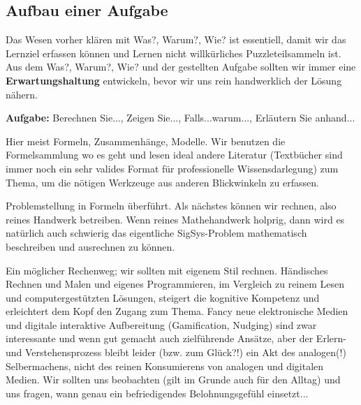 \subsection*{Aufbau einer Aufgabe}
\begin{Ziel}
Das Wesen vorher klären mit Was?, Warum?, Wie? ist essentiell, damit wir das
Lernziel erfassen können und Lernen nicht willkürliches Puzzleteilsammeln ist.
Aus dem Was?, Warum?, Wie? und der gestellten Aufgabe sollten wir immer eine
\textbf{Erwartungshaltung} entwickeln, bevor wir uns rein handwerklich der Lösung nähern.
\end{Ziel}
\textbf{Aufgabe:} Berechnen Sie..., Zeigen Sie..., Falls...warum..., Erläutern
Sie anhand...
\begin{Werkzeug}
Hier meist Formeln, Zusammenhänge, Modelle. Wir benutzen die Formelsammlung
wo es geht und lesen ideal andere Literatur (Textbücher sind immer noch ein sehr
valides Format für professionelle Wissensdarlegung) zum Thema, um die nötigen
Werkzeuge aus anderen Blickwinkeln zu erfassen.
\end{Werkzeug}
\begin{Ansatz}
Problemstellung in Formeln überführt. Als nächstes können wir rechnen, also
reines Handwerk betreiben. Wenn reines Mathehandwerk holprig, dann wird es natürlich auch schwierig das eigentliche SigSys-Problem mathematisch beschreiben und ausrechnen zu können.
\end{Ansatz}
\begin{ExCalc}
Ein möglicher Rechenweg; wir sollten mit eigenem Stil
rechnen.
Händisches Rechnen und Malen und eigenes Programmieren, im Vergleich zu reinem
Lesen und computergestützten Lösungen, steigert die kognitive Kompetenz und
erleichtert dem Kopf den Zugang zum Thema.
%
Fancy neue elektronische Medien und digitale interaktive Aufbereitung (Gamification, Nudging) sind zwar interessante und wenn gut gemacht auch zielführende Ansätze,
aber der Erlern- und Verstehensprozess bleibt leider (bzw. zum Glück?!) ein
Akt des analogen(!) Selbermachens, nicht des reinen Konsumierens von analogen und digitalen Medien.
%
Wir sollten uns beobachten (gilt im Grunde auch für den Alltag) und uns fragen, wann genau ein
befriedigendes Belohnungsgefühl einsetzt...
%
\end{ExCalc}
